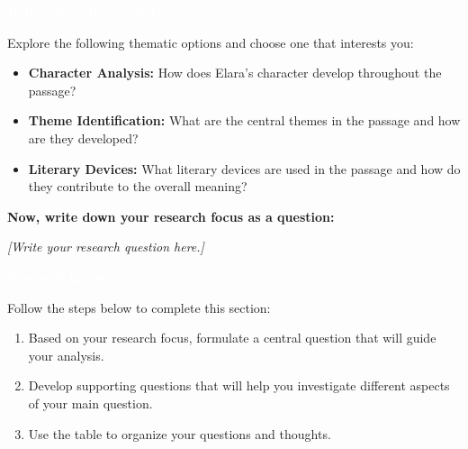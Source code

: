 \documentclass[a4paper,12pt]{article}
\newcommand{\sectionfont}[1]{{\headerfont\fontsize{20pt}{24pt}\selectfont\bfseries #1}}
\begin{document}
\begin{sectionheader}
\sectionfont{\textcolor{white}{Define Your Research Focus}}
\end{sectionheader}

\vspace{4pt}

Explore the following thematic options and choose one that interests you:

\begin{itemize}[leftmargin=1.5em, itemsep=2pt, topsep=4pt]
  \item \textbf{Character Analysis:} How does Elara's character develop throughout the passage?
  \item \textbf{Theme Identification:} What are the central themes in the passage and how are they developed?
  \item \textbf{Literary Devices:} What literary devices are used in the passage and how do they contribute to the overall meaning?
\end{itemize}

\textbf{Now, write down your research focus as a question:}

\vspace{4pt}

\begin{inputbox}
\textit{[Write your research question here.]}\par
\vspace{1.5cm}
\end{inputbox}

\vspace{4pt}

\begin{sectionheader}
\sectionfont{\textcolor{white}{Research Questions}}
\end{sectionheader}

\vspace{4pt}

Follow the steps below to complete this section:

\begin{enumerate}[leftmargin=1.5em, itemsep=2pt, topsep=4pt]
  \item Based on your research focus, formulate a central question that will guide your analysis.
  \item Develop supporting questions that will help you investigate different aspects of your main question.
  \item Use the table to organize your questions and thoughts.
\end{enumerate}
\end{document}
